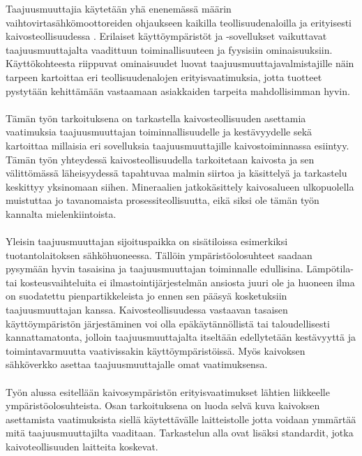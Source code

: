 \documentclass[finnish,12pt,a4paper,pdftex,elec,utf8]{aaltothesis}
\begin{document}
\thispagestyle{empty}
Taajuusmuuttajia käytetään yhä enenemässä määrin vaihtovirtasähkömoottoreiden ohjaukseen kaikilla teollisuudenaloilla ja erityisesti kaivosteollisuudessa \cite[s. 262]{Hakapää}. %
Erilaiset käyttöympäristöt ja -sovellukset vaikuttavat taajuusmuuttajalta vaadittuun toiminallisuuteen ja fyysisiin ominaisuuksiin. Käyttökohteesta riippuvat ominaisuudet luovat taajuusmuuttajavalmistajille näin tarpeen kartoittaa eri teollisuudenalojen erityisvaatimuksia, jotta tuotteet pystytään kehittämään vastaamaan asiakkaiden tarpeita mahdollisimman hyvin. 
\\\\
Tämän työn tarkoituksena on tarkastella kaivosteollisuuden asettamia vaatimuksia taajuusmuuttajan toiminnallisuudelle ja kestävyydelle sekä kartoittaa millaisia eri sovelluksia taajuusmuuttajille kaivostoiminnassa esiintyy. Tämän työn yhteydessä kaivosteollisuudella tarkoitetaan kaivosta ja sen välittömässä läheisyydessä tapahtuvaa malmin siirtoa ja käsittelyä ja tarkastelu keskittyy yksinomaan siihen. Mineraalien jatkokäsittely kaivosalueen ulkopuolella muistuttaa jo tavanomaista prosessiteollisuutta, eikä siksi ole tämän työn kannalta mielenkiintoista.
\\\\
Yleisin taajuusmuuttajan sijoituspaikka on sisätiloissa esimerkiksi tuotantolaitoksen sähköhuoneessa. Tällöin ympäristöolosuhteet saadaan pysymään hyvin tasaisina ja taajuusmuuttajan toiminnalle edullisina. Lämpötila- tai kosteusvaihteluita ei ilmastointijärjestelmän ansiosta juuri ole ja huoneen ilma on suodatettu pienpartikkeleista jo ennen sen pääsyä kosketuksiin taajuusmuuttajan kanssa. Kaivosteollisuudessa vastaavan tasaisen käyttöympäristön järjestäminen voi olla epäkäytännöllistä tai taloudellisesti kannattamatonta, jolloin taajuusmuuttajalta itseltään edellytetään kestävyyttä ja toimintavarmuutta vaativissakin käyttöympäristöissä. Myös kaivoksen sähköverkko asettaa taajuusmuuttajalle omat vaatimuksensa.
\\\\
Työn alussa esitellään kaivosympäristön erityisvaatimukset lähtien liikkeelle ympäristöolosuhteista. Osan tarkoituksena on luoda selvä kuva kaivoksen asettamista vaatimuksista siellä käytettävälle laitteistolle jotta voidaan ymmärtää mitä taajuusmuuttajilta vaaditaan. Tarkastelun alla ovat lisäksi standardit, jotka kaivoteollisuuden laitteita koskevat.
\\\\
\end{document}
